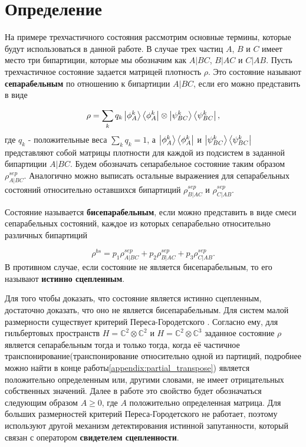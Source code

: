 
\section{Определение}
На примере трехчастичного состояния рассмотрим основные термины, которые будут использоваться в  данной работе.  В случае трех частиц $A$, $B$ и $C$ имеет место три бипартиции, которые мы обозначим как $A | BC$, $B | AC$ и $C | AB$.
Пусть трехчастичное состояние задается матрицей плотность $\rho$. Это состояние называют \textbf{сепарабельным} по отношению к бипартиции $A | BC$, если его можно представить в виде

\begin{equation}\label{sep-def}
\rho = \sum\limits_k q_k \ket{\phi_A^k} \bra{\phi_A^k}
\otimes \ket{\psi_{BC}^k} \bra{\psi_{BC}^k},
\end{equation}
где $q_k$ - положительные веса $\sum\limits_{k}q_k = 1$, а $\ket{\phi_A^k} \bra{\phi_A^k}$ и $\ket{\psi_{BC}^k} \bra{\psi_{BC}^k}$ представляют собой матрицы плотности для каждой из подсистем в заданной бипартиции $A | BC$. Будем обозначать сепарабельное состояние таким образом $\rho^{sep}_{A | BC}$. Аналогично можно выписать остальные выражениея для сепарабельных состояний относительно оставшихся бипартиций $\rho_{B | AC}^{sep}$ и $\rho_{C | AB}^{sep}$.

Состояние называется \textbf{бисепарабельным}, если можно представить в виде смеси сепарабельных состояний, каждое из которых сепарабельно относительно различных бипартиций

\begin{equation}\label{bisep-state-def}
    \rho^{bs} = p_1 \rho_{A | BC}^{sep} +
    p_2 \rho_{B | AC}^{sep} +
    p_3 \rho_{C | AB}^{sep}.
\end{equation}
В противном случае, если состояние не является бисепарабельным, то его называют \textbf{истинно сцепленным}.

Для того чтобы доказать, что состояние является истинно сцепленным, достаточно доказать, что оно не является бисепарабельным. Для систем малой размерности существует критерий Переса-Городетского \cite{criterion-peres-horodecki}.
Согласно ему, для гильбертовых пространств $H=\mathbb{C}^2\otimes\mathbb{C}^2$ и 
$H=\mathbb{C}^2\otimes\mathbb{C}^3$ заданное состояние $\rho$ является сепарабельным тогда и только тогда, когда её 
частичное транспонирование(транспонирование относительно одной из партиций, 
подробнее можно найти в конце работы\ref{appendix:partial_transpose}) 
является положительно определенным или, другими словами, 
не имеет отрицательных собственных значений. Далее в работе это свойство будет обозначаться следующим образом $A \geq 0$, 
где $A$ положительно определенная матрица.
Для больших размерностей критерий Переса-Городетского не работает, поэтому используют другой механизм детектирования истинной запутанности, который связан с оператором \textbf{свидетелем сцепленности}.


